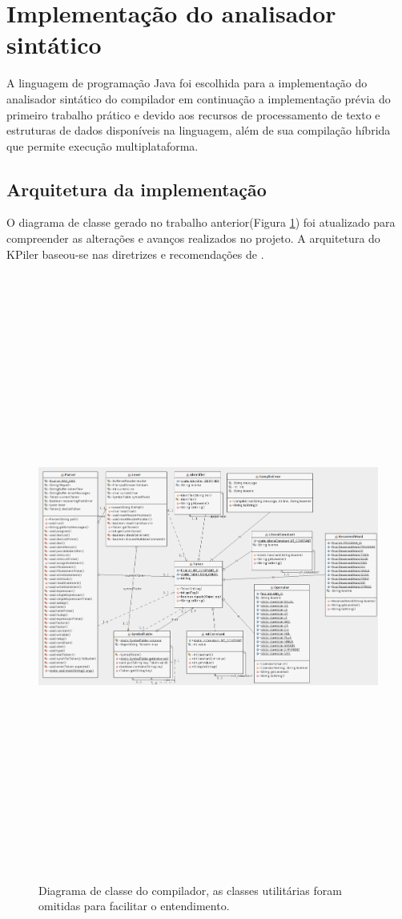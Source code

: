 \newpage
\section{Implementação do analisador sintático}

A linguagem de programação Java foi escolhida para a implementação do analisador sintático do compilador em continuação a implementação prévia do primeiro trabalho prático e devido aos recursos de processamento de texto e estruturas de dados disponíveis na linguagem, além de sua compilação híbrida que permite execução multiplataforma.

\subsection{Arquitetura da implementação}

  O diagrama de classe gerado no trabalho anterior(Figura \ref{fig:diagram}) foi atualizado para compreender as alterações e avanços realizados no projeto. A arquitetura do KPiler baseou-se nas diretrizes e recomendações de \cite{andrew2002modern}.

\begin{figure}[!h]
\centering
\includegraphics[width=16cm,height=20cm,keepaspectratio]{img/class_diagram.png}
\caption{Diagrama de classe do compilador, as classes utilitárias foram omitidas para facilitar o entendimento.}
\label{fig:diagram}
\end{figure}

